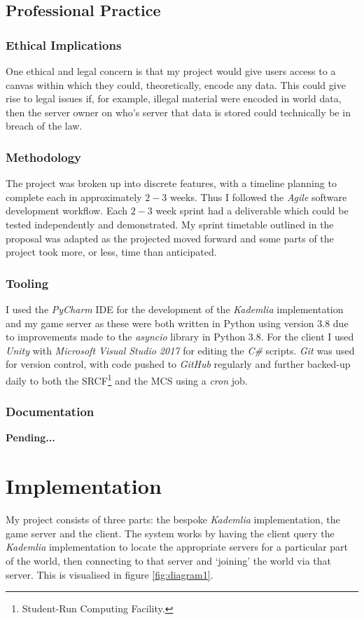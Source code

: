 \documentclass[10pt,twoside,notitlepage,a4paper]{report}
\newcommand{\unity}{\emph{Unity}}
\newcommand{\kademlia}{\emph{Kademlia}}
\begin{document}
	\section{Professional Practice}
	\subsection{Ethical Implications} %
	One ethical and legal concern is that my project would give users access to a canvas within which they could, theoretically, encode any data. This could give rise to legal issues if, for example, illegal material were encoded in world data, then the server owner on who's server that data is stored could technically be in breach of the law.
	
	\subsection{Methodology}
	The project was broken up into discrete features, with a timeline planning to complete each in approximately $2-3$ weeks. Thus I followed the \emph{Agile} software development workflow. Each $2-3$ week sprint had a deliverable which could be tested independently and demonstrated. My sprint timetable outlined in the proposal was adapted as the projected moved forward and some parts of the project took more, or less, time than anticipated.
	
	
	\subsection{Tooling}
	I used the \emph{PyCharm} IDE for the development of the \kademlia{} implementation and my game server as these were both written in Python using version $3.8$ due to improvements made to the \emph{asyncio} library in Python $3.8$. For the client I used \unity{} with \emph{Microsoft Visual Studio 2017} for editing the \emph{C\#} scripts. \emph{Git} was used for version control, with code pushed to \emph{GitHub} regularly and further backed-up daily to both the SRCF\footnote{Student-Run Computing Facility.} and the MCS using a \emph{cron} job.
	
	\subsection{Documentation}
	\textbf{Pending...}	
	
	\cleardoublepage
	\chapter{Implementation}
	My project consists of three parts: the bespoke \kademlia{} implementation, the game server and the client. The system works by having the client query the \kademlia{} implementation to locate the appropriate servers for a particular part of the world, then connecting to that server and `joining' the world via that server. This is visualised in figure \ref{fig:diagram1}.
	
\end{document}
